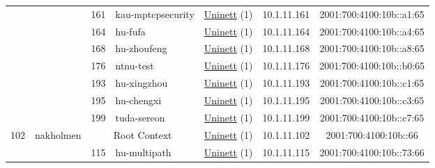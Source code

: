 \begin{small}
\begin{center}
\begin{longtable}{|c|c|c|c|c|c|c|c|}
  &  & \tiny{161} & \multicolumn{1}{|l|}{\tiny{kau-mptcpsecurity}} & \multicolumn{2}{|c|}{\tiny{\href{https://www.uninett.no}{Uninett} (1)}} & \tiny{10.1.11.161} & \tiny{2001:700:4100:10b::a1:65} \\* \cline{3-3}\cline{4-4}\cline{5-5}\cline{6-6}\cline{7-7}\cline{8-8}
  &  & \tiny{164} & \multicolumn{1}{|l|}{\tiny{hu-fufa}} & \multicolumn{2}{|c|}{\tiny{\href{https://www.uninett.no}{Uninett} (1)}} & \tiny{10.1.11.164} & \tiny{2001:700:4100:10b::a4:65} \\* \cline{3-3}\cline{4-4}\cline{5-5}\cline{6-6}\cline{7-7}\cline{8-8}
  &  & \tiny{168} & \multicolumn{1}{|l|}{\tiny{hu-zhoufeng}} & \multicolumn{2}{|c|}{\tiny{\href{https://www.uninett.no}{Uninett} (1)}} & \tiny{10.1.11.168} & \tiny{2001:700:4100:10b::a8:65} \\* \cline{3-3}\cline{4-4}\cline{5-5}\cline{6-6}\cline{7-7}\cline{8-8}
  &  & \tiny{176} & \multicolumn{1}{|l|}{\tiny{ntnu-test}} & \multicolumn{2}{|c|}{\tiny{\href{https://www.uninett.no}{Uninett} (1)}} & \tiny{10.1.11.176} & \tiny{2001:700:4100:10b::b0:65} \\* \cline{3-3}\cline{4-4}\cline{5-5}\cline{6-6}\cline{7-7}\cline{8-8}
  &  & \tiny{193} & \multicolumn{1}{|l|}{\tiny{hu-xingzhou}} & \multicolumn{2}{|c|}{\tiny{\href{https://www.uninett.no}{Uninett} (1)}} & \tiny{10.1.11.193} & \tiny{2001:700:4100:10b::c1:65} \\* \cline{3-3}\cline{4-4}\cline{5-5}\cline{6-6}\cline{7-7}\cline{8-8}
  &  & \tiny{195} & \multicolumn{1}{|l|}{\tiny{hu-chengxi}} & \multicolumn{2}{|c|}{\tiny{\href{https://www.uninett.no}{Uninett} (1)}} & \tiny{10.1.11.195} & \tiny{2001:700:4100:10b::c3:65} \\* \cline{3-3}\cline{4-4}\cline{5-5}\cline{6-6}\cline{7-7}\cline{8-8}
  &  & \tiny{199} & \multicolumn{1}{|l|}{\tiny{tuda-sereon}} & \multicolumn{2}{|c|}{\tiny{\href{https://www.uninett.no}{Uninett} (1)}} & \tiny{10.1.11.199} & \tiny{2001:700:4100:10b::c7:65} \\ \hline
 \multirow{13}{*}{\tiny{102}} & \multicolumn{1}{|l|}{\multirow{13}{*}{\tiny{nakholmen}}} & \multicolumn{2}{|c|}{\tiny{Root Context}} & \multicolumn{2}{|c|}{\tiny{\href{https://www.uninett.no}{Uninett} (1)}} & \tiny{10.1.11.102} & \tiny{2001:700:4100:10b::66} \\* \cline{3-3}\cline{4-4}\cline{5-5}\cline{6-6}\cline{7-7}\cline{8-8}
  &  & \tiny{115} & \multicolumn{1}{|l|}{\tiny{hu-multipath}} & \multicolumn{2}{|c|}{\tiny{\href{https://www.uninett.no}{Uninett} (1)}} & \tiny{10.1.11.115} & \tiny{2001:700:4100:10b::73:66} \\* \cline{3-3}\cline{4-4}\cline{5-5}\cline{6-6}\cline{7-7}\cline{8-8}

\end{longtable}
\end{center}
\end{small}
